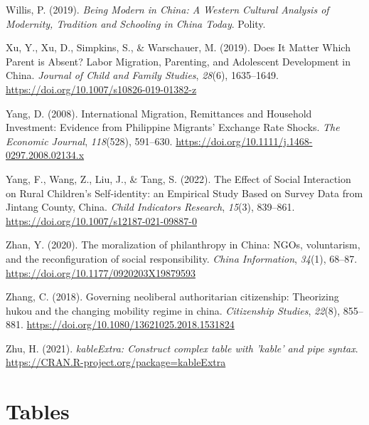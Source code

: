 \documentclass[
  man,floatsintext]{apa7}
\newlength{\cslhangindent}
\newlength{\cslentryspacingunit} %
\newenvironment{CSLReferences}[2] %
 {%
  \setlength{\parindent}{0pt}
  \ifodd #1
  \let\oldpar\par
  \def\par{\hangindent=\cslhangindent\oldpar}
  \fi
  \setlength{\parskip}{#2\cslentryspacingunit}
 }%
 {}
\begin{document}
\begin{CSLReferences}{1}{0}
\leavevmode{}%
Willis, P. (2019). \emph{Being Modern in China: A Western Cultural Analysis of Modernity, Tradition and Schooling in China Today}. Polity.

\leavevmode{}%
Xu, Y., Xu, D., Simpkins, S., \& Warschauer, M. (2019). Does It Matter Which Parent is Absent? Labor Migration, Parenting, and Adolescent Development in China. \emph{Journal of Child and Family Studies}, \emph{28}(6), 1635--1649. \url{https://doi.org/10.1007/s10826-019-01382-z}

\leavevmode{}%
Yang, D. (2008). International Migration, Remittances and Household Investment: Evidence from Philippine Migrants{'} Exchange Rate Shocks. \emph{The Economic Journal}, \emph{118}(528), 591--630. \url{https://doi.org/10.1111/j.1468-0297.2008.02134.x}

\leavevmode{}%
Yang, F., Wang, Z., Liu, J., \& Tang, S. (2022). The Effect of Social Interaction on Rural Children{'}s Self-identity: an Empirical Study Based on Survey Data from Jintang County, China. \emph{Child Indicators Research}, \emph{15}(3), 839--861. \url{https://doi.org/10.1007/s12187-021-09887-0}

\leavevmode{}%
Zhan, Y. (2020). The moralization of philanthropy in China: NGOs, voluntarism, and the reconfiguration of social responsibility. \emph{China Information}, \emph{34}(1), 68--87. \url{https://doi.org/10.1177/0920203X19879593}

\leavevmode{}%
Zhang, C. (2018). Governing neoliberal authoritarian citizenship: Theorizing hukou and the changing mobility regime in china. \emph{Citizenship Studies}, \emph{22}(8), 855--881. \url{https://doi.org/10.1080/13621025.2018.1531824}

\leavevmode{}%
Zhu, H. (2021). \emph{kableExtra: Construct complex table with 'kable' and pipe syntax}. \url{https://CRAN.R-project.org/package=kableExtra}

\end{CSLReferences}

\newpage

\hypertarget{appendix-the-appendix}{%
\appendix}


\hypertarget{tables}{%
\section{Tables}\label{tables}}
\end{document}
